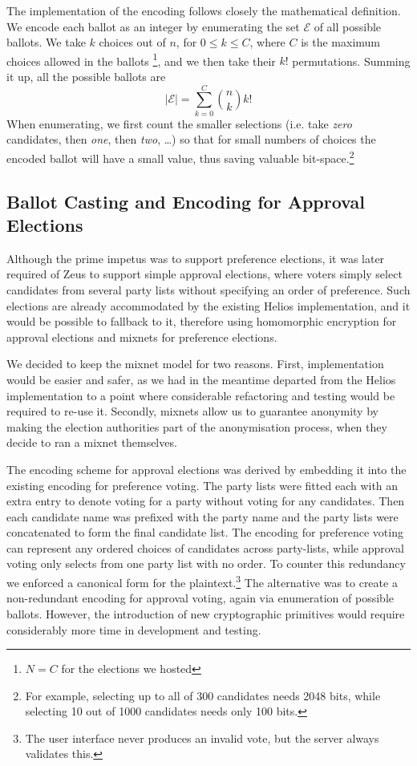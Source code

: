 \documentclass[letterpaper,10pt]{article}
\begin{document}
The implementation of the encoding follows closely the mathematical
definition. We encode each ballot as an integer by enumerating the set
$\mathcal{E}$ of all possible ballots. We take $k$ choices out of $n$,
for $0\leq k \leq C$, where $C$ is the maximum choices allowed in the
ballots \footnote{$N=C$ for the elections we hosted}, and we then take
their $k!$ permutations. Summing it up, all the possible ballots are
\begin{equation}
\label{eq:max_encoded}
|\mathcal{E}| = \sum^{C}_{k=0}\binom{n}{k}k!
\end{equation}
When enumerating, we first count the smaller selections (i.e. take
\textit{zero} candidates, then \textit{one}, then \textit{two},
\ldots) so that for small numbers of choices the encoded ballot will
have a small value, thus saving valuable bit-space.\footnote{ For
  example, selecting up to all of 300 candidates needs 2048 bits,
  while selecting 10 out of 1000 candidates needs only 100 bits.}


\subsection{Ballot Casting and Encoding for Approval Elections}

Although the prime impetus was to support preference elections, it was
later required of Zeus to support simple approval elections, where
voters simply select candidates from several party lists without
specifying an order of preference. Such elections are already
accommodated by the existing Helios implementation, and it would be
possible to fallback to it, therefore using homomorphic encryption for
approval elections and mixnets for preference elections.

We decided to keep the mixnet model for two reasons. First,
implementation would be easier and safer, as we had in the meantime
departed from the Helios implementation to a point where considerable
refactoring and testing would be required to re-use it. Secondly,
mixnets allow us to guarantee anonymity by making the election
authorities part of the anonymisation process, when they decide to
ran a mixnet themselves.

The encoding scheme for approval elections was derived by embedding it
into the existing encoding for preference voting. The party lists were
fitted each with an extra entry to denote voting for a party without
voting for any candidates. Then each candidate name was prefixed with
the party name and the party lists were concatenated to form the final
candidate list. The encoding for preference voting can represent any
ordered choices of candidates across party-lists, while approval voting
only selects from one party list with no order. To counter this
redundancy we enforced a canonical form for the plaintext.\footnote{The
user interface never produces an invalid vote, but the server always
validates this.}
The alternative was to create a non-redundant encoding for approval
voting, again via enumeration of possible ballots. However, the
introduction of new cryptographic primitives would require considerably
more time in development and testing.
\end{document}
